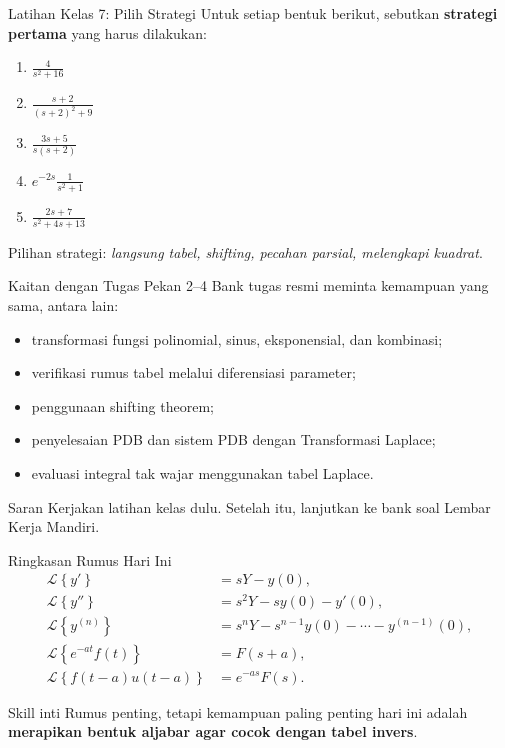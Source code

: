 \documentclass[aspectratio=169,10pt]{beamer}
\newcommand{\Lcal}{\mathcal{L}}
\newcommand{\Lap}[1]{\Lcal\left\{#1\right\}}
\begin{document}
\begin{frame}{Latihan Kelas 7: Pilih Strategi}
Untuk setiap bentuk berikut, sebutkan \textbf{strategi pertama} yang harus dilakukan:
\begin{enumerate}
\item $\displaystyle \frac{4}{s^2+16}$
\item $\displaystyle \frac{s+2}{(s+2)^2+9}$
\item $\displaystyle \frac{3s+5}{s(s+2)}$
\item $\displaystyle e^{-2s}\frac{1}{s^2+1}$
\item $\displaystyle \frac{2s+7}{s^2+4s+13}$
\end{enumerate}
Pilihan strategi: \emph{langsung tabel, shifting, pecahan parsial, melengkapi kuadrat}.
\end{frame}

\begin{frame}{Kaitan dengan Tugas Pekan 2--4}
Bank tugas resmi meminta kemampuan yang sama, antara lain:
\begin{itemize}
\item transformasi fungsi polinomial, sinus, eksponensial, dan kombinasi;
\item verifikasi rumus tabel melalui diferensiasi parameter;
\item penggunaan shifting theorem;
\item penyelesaian PDB dan sistem PDB dengan Transformasi Laplace;
\item evaluasi integral tak wajar menggunakan tabel Laplace.
\end{itemize}
\begin{block}{Saran}
Kerjakan latihan kelas dulu. Setelah itu, lanjutkan ke bank soal Lembar Kerja Mandiri.
\end{block}
\end{frame}

\begin{frame}{Ringkasan Rumus Hari Ini}
\small
\begin{align*}
\Lap{y'} &= sY-y(0),\\
\Lap{y''} &= s^2Y-sy(0)-y'(0),\\
\Lap{y^{(n)}} &= s^nY-s^{n-1}y(0)-\cdots-y^{(n-1)}(0),\\
\Lap{e^{-at}f(t)} &= F(s+a),\\
\Lap{f(t-a)u(t-a)} &= e^{-as}F(s).
\end{align*}
\begin{alertblock}{Skill inti}
Rumus penting, tetapi kemampuan paling penting hari ini adalah \textbf{merapikan bentuk aljabar agar cocok dengan tabel invers}.
\end{alertblock}
\end{frame}
\end{document}
